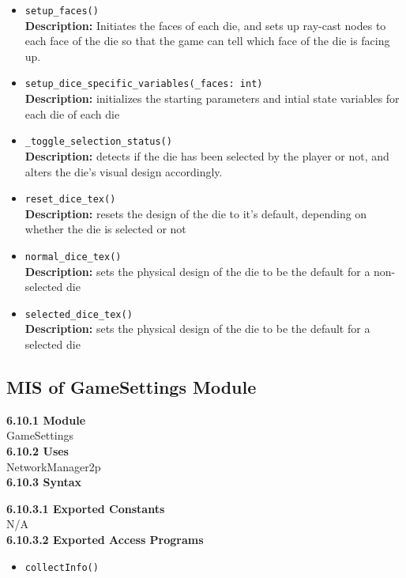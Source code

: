 \documentclass[12pt, titlepage]{article}
\begin{document}
\begin{itemize}
    \item \texttt{setup\_faces() }\\
	\textbf{Description:} Initiates the faces of each die, and sets up ray-cast nodes to each face of the die so that the game can tell which face of the die is facing up.
	\item \texttt{setup\_dice\_specific\_variables(\_faces: int) }\\
	\textbf{Description:} initializes the starting parameters and intial state variables for each die of each die 
	\item \texttt{\_toggle\_selection\_status() }\\
	\textbf{Description:} detects if the die has been selected by the player or not, and alters the die's visual design accordingly.
	\item \texttt{reset\_dice\_tex() }\\
	\textbf{Description:} resets the design of the die to it's default, depending on whether the die is selected or not
	\item \texttt{normal\_dice\_tex() }\\
	\textbf{Description:} sets the physical design of the die to be the default for a non-selected die
	\item \texttt{selected\_dice\_tex() }\\
	\textbf{Description:} sets the physical design of the die to be the default for a selected die	
	
	
\end{itemize}


\subsection{MIS of GameSettings Module}
\textbf{6.10.1 Module}\\
 GameSettings\\

\noindent \textbf{6.10.2 Uses}\\
NetworkManager2p \\

\noindent \textbf{6.10.3 Syntax}

\noindent \textbf{6.10.3.1 Exported Constants}\\
N/A\\

\textbf{6.10.3.2 Exported Access Programs}
\begin{itemize}
	\item \texttt{collectInfo()}
	
	
\end{itemize}
\end{document}
